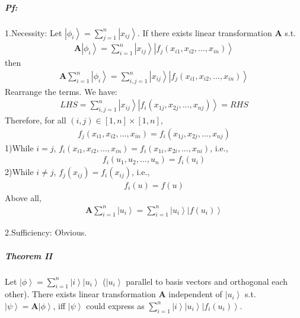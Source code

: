 \documentclass[%
 reprint,
 amsmath,amssymb,
pra,
]{revtex4-1}
\begin{document}
\subparagraph{Pf:} 1.Necessity: Let $\left|\phi_i\right\rangle = \sum_{j=1}^n \left|x_{ij}\right\rangle$. If there exists linear transformation $\bm{A}$ s.t.
\begin{align*}
\bm{A}\left|\phi_i\right\rangle = \sum_{i=1}^n\left|x_{ij}\right\rangle\left|f_{j}\left(x_{i1}, x_{i2}, ..., x_{in}\right)\right\rangle
\end{align*}
then
\begin{align*}
\bm{A}\sum_{i=1}^{n}\left|\phi_i\right\rangle = \sum_{i, j=1}^n\left|x_{ij}\right\rangle\left|f_{j}\left(x_{i1}, x_{i2}, ..., x_{in}\right)\right\rangle
\end{align*}
Rearrange the terms. We have: 
\begin{align*}
LHS = \sum_{i, j=1}^n\left|x_{ij}\right\rangle\left|f_{i}\left(x_{1j}, x_{2j}, ..., x_{nj}\right)\right\rangle = RHS
\end{align*}
Therefore, for all $\left(i, j\right) \in \left[1, n\right]\times\left[1, n\right]$, 
\begin{align*}
f_{j}\left(x_{i1}, x_{i2}, ..., x_{in}\right) = f_{i}\left(x_{1j}, x_{2j}, ..., x_{nj}\right)
\end{align*}
1)While $i=j$, $f_{i}\left(x_{i1}, x_{i2}, ..., x_{in}\right) = f_{i}\left(x_{1i}, x_{2i}, ..., x_{ni}\right)$, i.e., 
\begin{align*}
f_i\left(u_1, u_2, ...,u_n\right) = f_i\left(u_i\right)
\end{align*}
2)While $i\neq j$, $f_j\left(x_{ij}\right) = f_i\left(x_{ij}\right)$, i.e., 
\begin{align*}
f_i\left(u\right) = f\left(u\right)
\end{align*}
Above all, 
\begin{align*}
\bm{A}\sum_{i=1}^{n}\left|u_i\right\rangle = \sum_{i=1}^{n}\left|u_i\right\rangle\left|f\left(u_i\right)\right\rangle
\end{align*}

2.Sufficiency: Obvious.

\subparagraph{Theorem II} Let $\left|\phi\right\rangle = \sum_{i=1}^n \left|i\right\rangle\left|u_i\right\rangle$ ($\left|u_i\right\rangle$ parallel to basis vectors and orthogonal each other). There exists 
linear transformation $\bm{A}$ independent of $\left|u_{i}\right\rangle$ s.t. $\left|\psi\right\rangle = \bm{A}\left|\phi\right\rangle$, iff $\left|\psi\right\rangle$ could express as $\sum_{i=1}^n \left|i\right\rangle\left|u_i\right\rangle\left|f_{i}\left(u_i\right)\right\rangle$.
\end{document}
